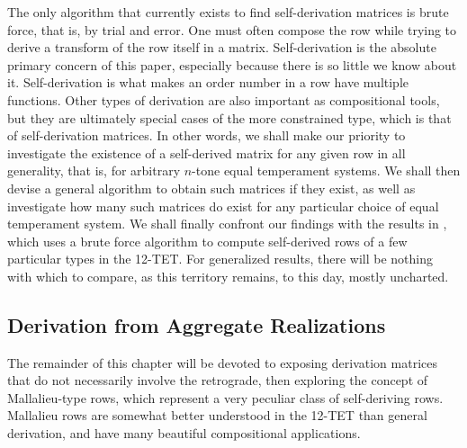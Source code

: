 The only algorithm that currently exists to find self-derivation matrices is brute force, that is, by trial and error. One must often compose the row while trying to derive a transform of the row itself in a matrix. Self-derivation is the absolute primary concern of this paper, especially because there is so little we know about it. Self-derivation is what makes an order number in a row have multiple functions. Other types of derivation are also important as compositional tools, but they are ultimately special cases of the more constrained type, which is that of self-derivation matrices. In other words, we shall make our priority to investigate the existence of a self-derived matrix for any given row in all generality, that is, for arbitrary $n$-tone equal temperament systems. We shall then devise a general algorithm to obtain such matrices if they exist, as well as investigate how many such matrices do exist for any particular choice of equal temperament system. We shall finally confront our findings with the results in \cite{Kowalski1987b}, which uses a brute force algorithm to compute self-derived rows of a few particular types in the 12-TET. For generalized results, there will be nothing with which to compare, as this territory remains, to this day, mostly uncharted.

\subsection{Derivation from Aggregate Realizations}

The remainder of this chapter will be devoted to exposing derivation matrices that do not necessarily involve the retrograde, then exploring the concept of Mallalieu-type rows, which represent a very peculiar class of self-deriving rows. Mallalieu rows are somewhat better understood in the 12-TET than general derivation, and have many beautiful compositional applications.

